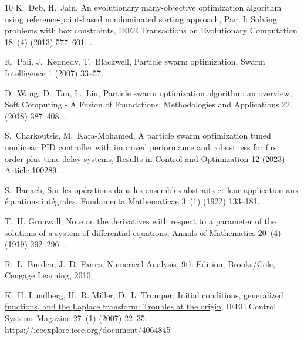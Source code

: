 \documentclass[preprint,12pt]{elsarticle}
\begin{document}
\begin{thebibliography}{10}
	K.~Deb, H.~Jain, An evolutionary many-objective optimization algorithm using
	reference-point-based nondominated sorting approach, {Part I}: {S}olving
	problems with box constraints, IEEE Transactions on Evolutionary Computation
	18~(4) (2013) 577--601.
	\newblock \href {https://doi.org/10.1109/TEVC.2013.2281535}
	{}.
	
	R.~Poli, J.~Kennedy, T.~Blackwell, Particle swarm optimization, Swarm
	Intelligence 1 (2007) 33--57.
	\newblock \href {https://doi.org/10.1007/s11721-007-0002-0}
	{}.
	
	D.~Wang, D.~Tan, L.~Liu, Particle swarm optimization algorithm: an overview,
	Soft Computing - A Fusion of Foundations, Methodologies and Applications 22
	(2018) 387--408.
	\newblock \href {https://doi.org/10.1007/s00500-016-2474-6}
	{}.
	
	S.~Charkoutsis, M.~Kara-Mohamed, A particle swarm optimization tuned nonlinear
	{PID} controller with improved performance and robustness for first order
	plus time delay systems, Results in Control and Optimization 12 (2023)
	Article 100289.
	\newblock \href {https://doi.org/10.1016/j.rico.2023.100289}
	{}.
	
	S.~Banach, Sur les op\'{e}rations dans les ensembles abstraits et leur
	application aux \'{e}quations int\'{e}grales, Fundamenta Mathematicae 3~(1)
	(1922) 133--181.
	
	T.~H. Gronwall, Note on the derivatives with respect to a parameter of the
	solutions of a system of differential equations, Annals of Mathematics 20~(4)
	(1919) 292--296.
	\newblock \href {https://doi.org/https://doi.org/10.2307/1967124}
	{}.
	
	R.~L. Burden, J.~D. Faires, Numerical Analysis, 9th Edition, Brooks/Cole,
	Cengage Learning, 2010.
	
	K.~H. Lundberg, H.~R. Miller, D.~L. Trumper,
	\href{https://ieeexplore.ieee.org/document/4064845}{Initial conditions,
		generalized functions, and the {Laplace} transform: Troubles at the origin},
	IEEE Control Systems Magazine 27~(1) (2007) 22--35.
	\newblock \href {https://doi.org/10.1109/MCS.2007.284506}
	{}.
	\newline\urlprefix\url{https://ieeexplore.ieee.org/document/4064845}
	

\end{thebibliography}
\end{document}
